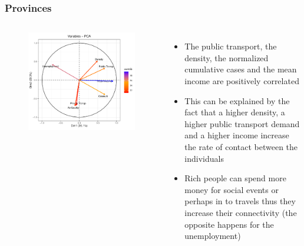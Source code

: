 \documentclass[compress]{beamer}
\begin{document}
\begin{frame}


\frametitle{Provinces}

\begin{columns}
\begin{figure}[H]
\centering
\begin{minipage}{\textwidth}
  \centering
  \includegraphics[width=\linewidth, ]{Pic/Province_FULL_Variables-PCA.pdf}
\end{minipage}%
\end{figure}
\begin{itemize}
\item The public transport, the density, the normalized cumulative cases and the mean income are positively correlated
\item This can be explained by the fact that a higher density, a higher public transport demand and a higher income increase the rate of contact between the individuals
\item Rich people can spend more money for social events or perhaps in to travels thus they increase their connectivity (the opposite happens for the unemployment)
\end{itemize}
\end{columns}
\end{frame}
\end{document}
